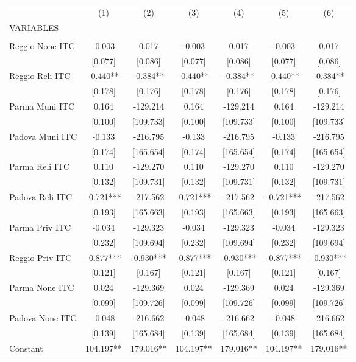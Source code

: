 \begin{tabular}{lcccccc} \hline
 & (1) & (2) & (3) & (4) & (5) & (6) \\
VARIABLES &  &  &  &  &  &  \\ \hline
 &  &  &  &  &  &  \\
Reggio None ITC & -0.003 & 0.017 & -0.003 & 0.017 & -0.003 & 0.017 \\
 & [0.077] & [0.086] & [0.077] & [0.086] & [0.077] & [0.086] \\
Reggio Reli ITC & -0.440** & -0.384** & -0.440** & -0.384** & -0.440** & -0.384** \\
 & [0.178] & [0.176] & [0.178] & [0.176] & [0.178] & [0.176] \\
Parma Muni ITC & 0.164 & -129.214 & 0.164 & -129.214 & 0.164 & -129.214 \\
 & [0.100] & [109.733] & [0.100] & [109.733] & [0.100] & [109.733] \\
Padova Muni ITC & -0.133 & -216.795 & -0.133 & -216.795 & -0.133 & -216.795 \\
 & [0.174] & [165.654] & [0.174] & [165.654] & [0.174] & [165.654] \\
Parma Reli ITC & 0.110 & -129.270 & 0.110 & -129.270 & 0.110 & -129.270 \\
 & [0.132] & [109.731] & [0.132] & [109.731] & [0.132] & [109.731] \\
Padova Reli ITC & -0.721*** & -217.562 & -0.721*** & -217.562 & -0.721*** & -217.562 \\
 & [0.193] & [165.663] & [0.193] & [165.663] & [0.193] & [165.663] \\
Parma Priv ITC & -0.034 & -129.323 & -0.034 & -129.323 & -0.034 & -129.323 \\
 & [0.232] & [109.694] & [0.232] & [109.694] & [0.232] & [109.694] \\
Reggio Priv ITC & -0.877*** & -0.930*** & -0.877*** & -0.930*** & -0.877*** & -0.930*** \\
 & [0.121] & [0.167] & [0.121] & [0.167] & [0.121] & [0.167] \\
Parma None ITC & 0.024 & -129.369 & 0.024 & -129.369 & 0.024 & -129.369 \\
 & [0.099] & [109.726] & [0.099] & [109.726] & [0.099] & [109.726] \\
Padova None ITC & -0.048 & -216.662 & -0.048 & -216.662 & -0.048 & -216.662 \\
 & [0.139] & [165.684] & [0.139] & [165.684] & [0.139] & [165.684] \\
Constant & 104.197** & 179.016** & 104.197** & 179.016** & 104.197** & 179.016** \\

\end{tabular}
